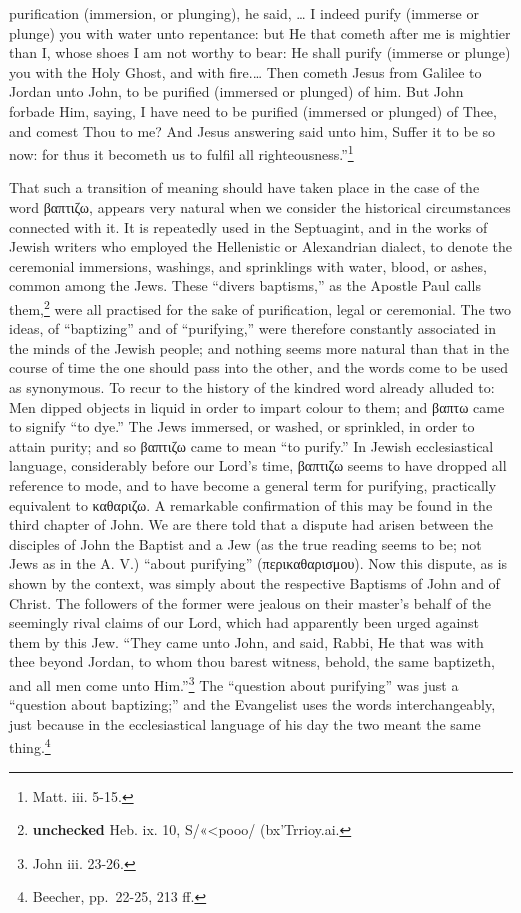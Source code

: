 \documentclass[]{book}
\begin{document}
purification (immersion, or plunging), he said, \ldots{} I indeed purify (immerse or plunge) you with water unto repentance: but He that cometh after me is mightier than I, whose shoes I am not worthy to bear: He shall purify (immerse or plunge) you with the Holy Ghost, and with fire.\ldots{} Then cometh Jesus from Galilee to Jordan unto John, to be purified (immersed or plunged) of him. But John forbade Him, saying, I have need to be purified (immersed or plunged) of Thee, and comest Thou to me? And Jesus answering said unto him, Suffer it to be so now: for thus it becometh us to fulfil all righteousness.''\footnote{Matt. iii. 5-15.}

That such a transition of meaning should have taken place in the case of the word βαπτιζω, appears very natural when we consider the historical circumstances connected with it. It is repeatedly used in the Septuagint, and in the works of Jewish writers who employed the Hellenistic or Alexandrian dialect, to denote the ceremonial immersions, washings, and sprinklings with water, blood, or ashes, common among the Jews. These ``divers baptisms,'' as the Apostle Paul calls them,\footnote{\textbf{unchecked} Heb. ix. 10, S/«\textless{}pooo/ (bx'Trrioy.ai.} were all practised for the sake of purification, legal or ceremonial. The two ideas, of ``baptizing'' and of ``purifying,'' were therefore constantly associated in the minds of the Jewish people; and nothing seems more natural than that in the course of time the one should pass into the other, and the words come to be used as synonymous. To recur to the history of the kindred word already alluded to: Men dipped objects in liquid in order to impart colour to them; and βαπτω came to signify ``to dye.'' The Jews immersed, or washed, or sprinkled, in order to attain purity; and so βαπτιζω came to mean ``to purify.'' In Jewish ecclesiastical language, considerably before our Lord's time, βαπτιζω seems to have dropped all reference to mode, and to have become a general term for purifying, practically equivalent to καθαριζω. A remarkable confirmation of this may be found in the third chapter of John. We are there told that a dispute had arisen between the disciples of John the Baptist and a Jew (as the true reading seems to be; not Jews as in the A. V.) ``about purifying'' (περικαθαρισμου). Now this dispute, as is shown by the context, was simply about the respective Baptisms of John and of Christ. The followers of the former were jealous on their master's behalf of the seemingly rival claims of our Lord, which had apparently been urged against them by this Jew. ``They came unto John, and said, Rabbi, He that was with thee beyond Jordan, to whom thou barest witness, behold, the same baptizeth, and all men come unto Him.''\footnote{John iii. 23-26.} The ``question about purifying'' was just a ``question about baptizing;'' and the Evangelist uses the words interchangeably, just because in the ecclesiastical language of his day the two meant the same thing.\footnote{Beecher, pp.~22-25, 213 ff.}
\end{document}
